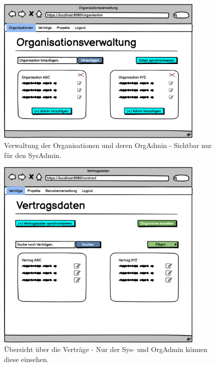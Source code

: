 \begin{figure}[h]
\centering
\includegraphics[width=10cm]{img/mockup_web/system-admin-orgs.png}
\caption{Verwaltung der Organisationen und deren OrgAdmin - Sichtbar nur für den SysAdmin.}
\end{figure}

\begin{figure}[h]
\centering
\includegraphics[width=10cm]{img/mockup_web/admin-vertraege.png}
\caption{Übersicht über die Verträge - Nur der Sys- und OrgAdmin können diese einsehen.}
\end{figure}


